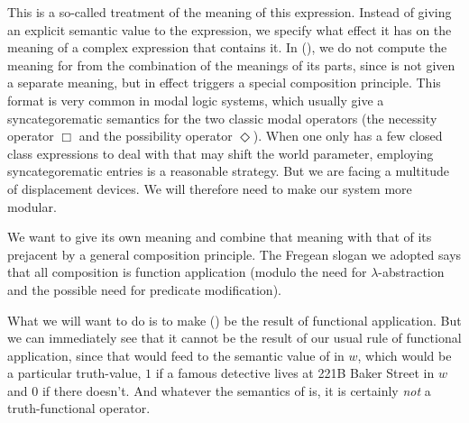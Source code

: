 This is a so-called  treatment of the meaning of this
expression. Instead of giving an explicit semantic value to the expression, we
specify what effect it has on the meaning of a complex expression that contains
it. In (\lastx), we do not compute the meaning for  from the combination of the meanings of its parts,
since  is not given a separate
meaning, but in effect triggers a special composition principle. This %
%
format is very common in modal logic systems, which usually give a
syncategorematic semantics for the two classic modal operators (the necessity
operator $\Box$ and the possibility operator $\Diamond$). When one only has a
few closed class expressions to deal with that may shift the world parameter,
employing syncategorematic entries is a reasonable strategy. But we are facing a
multitude of displacement devices. We will therefore need to make our system
more modular.

We want to give  its own meaning
and combine that meaning with that of its prejacent by a general composition
principle. The Fregean slogan we adopted says that all composition is function
application (modulo the need for $\lambda$-abstraction and the possible need for
predicate modification).

What we will want to do is to make (\blastx) be the result of functional
application. But we can immediately see that it cannot be the result of our
usual rule of functional application, since that would feed to  the semantic value of  in $w$, which would be a particular
truth-value, $1$ if a famous detective lives at 221B Baker Street in $w$ and $0$
if there doesn't. And whatever the semantics of  is, it is certainly \emph{not} a truth-functional operator.

